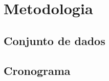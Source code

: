\chapter{Metodologia}
\label{cap:metodologia}


\section{Conjunto de dados}


\section{Cronograma}
















